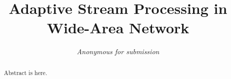 \documentclass{sig-alternate-10pt}
\begin{document}



\title{Adaptive Stream Processing in Wide-Area Network}
\author{
  \alignauthor
  \textit{Anonymous for submission}
}

\maketitle

\begin{abstract}
  Abstract is here.
\end{abstract}





{\footnotesize }
\end{document}
